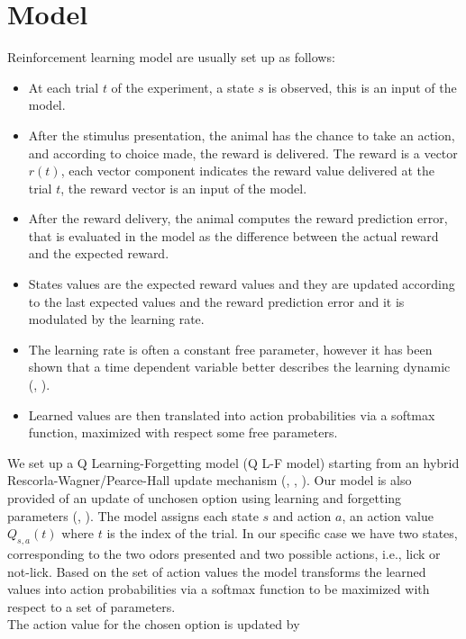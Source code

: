 \section{Model}
\label{sec:Model}
Reinforcement learning model are usually set up as follows:
\begin{itemize}
    \item At each trial $t$ of the experiment, a state $s$ is observed, this is an input of the model.
    \item After the stimulus presentation, the animal has the chance to take an action, and according to choice made, the reward is delivered. The reward is a vector $r(t)$, each vector component indicates the reward value delivered at the trial $t$, the reward vector is an input of the model.
    \item After the reward delivery, the animal computes the reward prediction error, that is evaluated in the model as the difference between the actual reward and the expected reward.
    \item States values are the expected reward values and they are updated according to the last expected values and the reward prediction error and it is modulated by the learning rate.
    \item The learning rate is often a constant free parameter, however it has been shown that a time dependent variable better describes the learning dynamic (\cite{Funamizu}, \cite{Daw}).
    \item Learned values are then translated into action probabilities via a softmax function, maximized with respect some free parameters.
\end{itemize}
We set up a Q Learning-Forgetting model (Q L-F model) starting from an hybrid Rescorla-Wagner/Pearce-Hall update mechanism (\cite{Koppe}, \cite{Costa}, \cite{Li}). Our model is also provided of an update of unchosen option using learning and forgetting parameters (\cite{ItoDoya1}, \cite{Katahira}).
The model assigns each state $s$ and action $a$, an action value $Q_{s,a}(t)$ where $t$ is the index of the trial. In our specific case we have two states, corresponding to the two odors presented and two possible actions, i.e., lick or not-lick. 
Based on the set of action values the model transforms the learned values into action probabilities via a softmax function to be maximized with respect to a set of parameters.\\The action value for the chosen option is updated by
